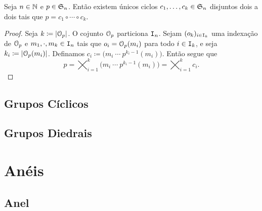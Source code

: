 \begin{prop}
	Seja $n \in \mathbb{N}$ e $p \in \mathfrak{S}_n$. Então existem únicos ciclos $c_1,\ldots,c_k \in \mathfrak{S}_n$ disjuntos dois a dois tais que $p=c_1 \circ \cdots \circ c_k$.
\end{prop}
\begin{proof}
	Seja $k \coloneqq \left\vert{\mathcal{O}_p}\right\vert$. O cojunto $\mathcal{O}_p$ particiona $\mathtt I_n$. Sejam $(o_k)_{i \in \mathtt I_k}$ uma indexação de $\mathcal{O}_p$ e $m_1,\cdot,m_k \in \mathtt I_n$ tais que $o_i=\mathcal{O}_p(m_i)$ para todo $i \in \mathtt I_k$, e seja $k_i \coloneqq \left\vert{\mathcal{O}_p(m_i)}\right\vert$. Definamos $c_i \coloneqq  \bigl( m_i \ \cdots \  p^{k_i-1}(m_i)\bigr)$. Então segue que
	\begin{equation*}
	p = \bigtimes_{i=1}^k \bigl( m_i \ \cdots \  p^{k_i-1}(m_i)\bigr) = \bigtimes_{i=1}^k c_i.
	\end{equation*}
\end{proof}




\section{Grupos Cíclicos}

\section{Grupos Diedrais}



























\newpage

\chapter{Anéis}

\section{Anel}

